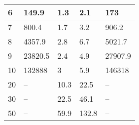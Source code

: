 \begin{table}[h]
\begin{tabular}{||l|llll||}
    6          & 149.9                                                             & 1.3                                                               & 2.1                                                                       & 173                                                                        \\ \hline
    7          & 800.4                                                             & 1.7                                                               & 3.2                                                                       & 906.2                                                                      \\ \hline
    8          & 4357.9                                                            & 2.8                                                               & 6.7                                                                       & 5021.7                                                                     \\ \hline
    9          & 23820.5                                                           & 2.4                                                               & 4.9                                                                       & 27907.9                                                                    \\ \hline
    10         & 132888                                                            & 3                                                                 & 5.9                                                                       & 146318                                                                     \\ \hline
    20         & --                                                                & 10.3                                                              & 22.5                                                                      & --                                                                         \\ \hline
    30         & --                                                                & 22.5                                                              & 46.1                                                                      & --                                                                         \\ \hline
    50         & --                                                                & 59.9                                                              & 132.8                                                                     & --                                                                         \\ \hline

\end{tabular}
\end{table}
